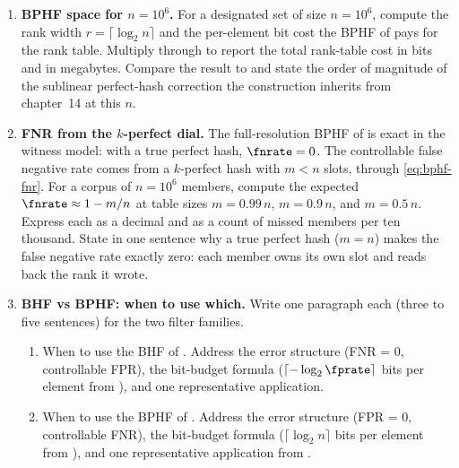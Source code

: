 \begin{enumerate}


\item \exstar
\label{ex:ch15-1}
\textbf{BPHF space for $n = 10^6$.}
For a designated set of size $n = 10^6$, compute the rank width
$r = \lceil \log_2 n \rceil$ and the per-element bit cost the BPHF
of  pays for the rank table. Multiply through to
report the total rank-table cost in bits and in megabytes. Compare
the result to  and state the order of
magnitude of the sublinear perfect-hash correction the construction
inherits from chapter~14 at this $n$.

\item \exstar
\label{ex:ch15-2}
\textbf{FNR from the $k$-perfect dial.}
The full-resolution BPHF of  is exact in the witness
model: with a true perfect hash, $\fnrate = 0$. The controllable
false negative rate comes from a $k$-perfect hash with $m < n$ slots,
through \eqref{eq:bphf-fnr}. For a corpus of $n = 10^6$ members,
compute the expected $\fnrate \approx 1 - m/n$ at table sizes
$m = 0.99\,n$, $m = 0.9\,n$, and $m = 0.5\,n$. Express each as a
decimal and as a count of missed members per ten thousand. State in
one sentence why a true perfect hash ($m = n$) makes the false
negative rate exactly zero: each member owns its own slot and reads
back the rank it wrote.

\item \exstar
\label{ex:ch15-3}
\textbf{BHF vs BPHF: when to use which.}
Write one paragraph each (three to five sentences) for the two
filter families.
\begin{enumerate}
  \item[(a)] When to use the BHF of . Address the
    error structure (FNR = 0, controllable FPR), the bit-budget
    formula ($\lceil -\log_2 \fprate \rceil$ bits per element from
    ), and one representative application.
  \item[(b)] When to use the BPHF of . Address the
    error structure (FPR = 0, controllable FNR), the bit-budget
    formula ($\lceil \log_2 n \rceil$ bits per element from
    ), and one representative application from
    .
\end{enumerate}


\end{enumerate}
